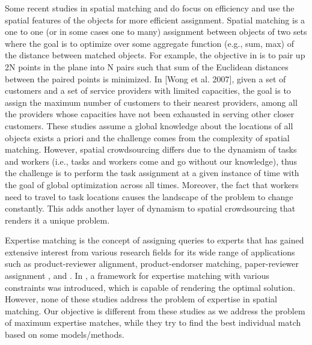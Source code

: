 \documentclass{USC-Thesis}
\numberwithin{equation}{chapter}
\begin{document}
Some recent studies in spatial matching \cite{wong2007efficient} and \cite{yiu2008capacity} do focus on efficiency and use the spatial features of the objects for more efficient assignment. Spatial matching is a one to one (or in some cases one to many) assignment between objects of two sets where the goal is to optimize over some aggregate function (e.g., sum, max) of the distance between matched objects. For example, the objective in \cite{varadarajan1998divide} is to pair up 2N points in the plane into N pairs such that sum of the Euclidean distances between the paired points is minimized. In [Wong et al. 2007], given a set of customers and a set of service providers with limited capacities, the goal is to assign the maximum number of customers to their nearest providers, among all the providers whose capacities have not been exhausted in serving other closer customers. These studies assume a global knowledge about the locations of all objects exists a priori and the challenge comes from the complexity of spatial matching. However, spatial crowdsourcing differs due to the dynamism of tasks and workers (i.e., tasks and workers come and go without our knowledge), thus the challenge is to perform the task assignment at a given instance of time with the goal of global optimization across all times. Moreover, the fact that workers need to travel to task locations causes the landscape of the problem to change constantly. This adds another layer of dynamism to spatial crowdsourcing that renders it a unique problem.


Expertise matching is the concept of assigning queries to experts that has gained extensive interest from various research fields for its wide range of applications such as product-reviewer alignment, product-endorser matching, paper-reviewer assignment \cite{mimno2007expertise}, \cite{sun2008hybrid} and \cite{hettich2006mining}. In \cite{tang2012optimization}, a framework for expertise matching with various constraints was introduced, which is capable of rendering the optimal solution. However, none of these studies address the problem of expertise in spatial matching. Our objective is different from these studies as we address the problem of maximum expertise matches, while they try to find the best individual match based on some models/methods.
\end{document}
